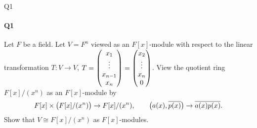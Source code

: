 \documentclass[12pt]{article}
\newenvironment{fullbox}{\begin{lrbox}{\savefullbox}\begin{minipage}{\dimexpr\textwidth-2\fboxsep\relax}}{\end{minipage}\end{lrbox}\begin{center}\framebox[\textwidth]{\usebox{\savefullbox}}\end{center}}
\newenvironment{pbox}[1][]{\begin{fullbox}\ifx#1\empty\else\paragraph{#1}\fi}{\end{fullbox}}
\theoremstyle{definition}
\newcommand{\ds}{\displaystyle}
\newcommand{\isom}{\cong}
\newcommand{\eqc}{\overline}
\begin{document}
\thispagestyle{title}


\begin{pbox}[Q1]
    Let $F$ be a field. Let $V = F^n$ viewed as an $F[x]$-module with respect to the linear transformation $T : V \to V$, $T = \ds\mqty(x_1 \\ \vdots \\ x_{n-1} \\ x_n) = \mqty(x_2 \\ \vdots \\ x_n \\ 0)$. View the quotient ring $F[x]/(x^n)$ as an $F[x]$-module by
    \[
        F[x] \times \qty\big(F[x]/(x^n)) \to F[x]/(x^n), \qquad \qty\big(a(x), \eqc{p(x)}) \to \eqc{a(x)p(x)}.
    \]
    Show that $V \isom F[x]/(x^n)$ as $F[x]$-modules.
\end{pbox}
\end{document}
